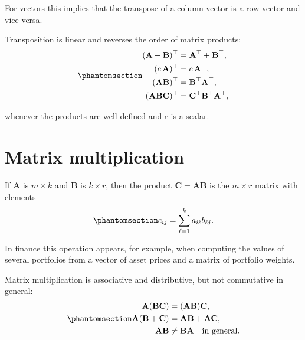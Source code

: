 \documentclass[
  letterpaper,
  DIV=11,
  numbers=noendperiod]{scrreprt}
\begin{document}
For vectors this implies that the transpose of a column vector is a row
vector and vice versa.

Transposition is linear and reverses the order of matrix products:
\begin{equation}\protect\phantomsection\label{eq-gen-0048}{  
\begin{align}
(\mathbf{A} + \mathbf{B})^{\top} &= \mathbf{A}^{\top} + \mathbf{B}^{\top}, \\
(c\,\mathbf{A})^{\top}           &= c\,\mathbf{A}^{\top}, \\
(\mathbf{A}\mathbf{B})^{\top}    &= \mathbf{B}^{\top}\mathbf{A}^{\top}, \\
(\mathbf{A}\mathbf{B}\mathbf{C})^{\top}
                                   &= \mathbf{C}^{\top}\mathbf{B}^{\top}\mathbf{A}^{\top},
\end{align}
}\end{equation}

whenever the products are well defined and \(c\) is a scalar.

\section{Matrix multiplication}\label{matrix-multiplication}

If \(\mathbf{A}\) is \(m \times k\) and \(\mathbf{B}\) is
\(k \times r\), then the product \(\mathbf{C}=\mathbf{A}\mathbf{B}\) is
the \(m \times r\) matrix with elements
\begin{equation}\protect\phantomsection\label{eq-gen-0049}{  
\begin{align}
c_{ij} = \sum_{\ell=1}^{k} a_{i\ell} b_{\ell j}.
\end{align}
}\end{equation}

In finance this operation appears, for example, when computing the
values of several portfolios from a vector of asset prices and a matrix
of portfolio weights.

Matrix multiplication is associative and distributive, but not
commutative in general:
\begin{equation}\protect\phantomsection\label{eq-gen-0050}{  
\begin{align}
\mathbf{A}(\mathbf{B}\mathbf{C}) &= (\mathbf{A}\mathbf{B})\mathbf{C}, \\
\mathbf{A}(\mathbf{B}+\mathbf{C}) &= \mathbf{A}\mathbf{B} + \mathbf{A}\mathbf{C}, \\
\mathbf{A}\mathbf{B} &\neq \mathbf{B}\mathbf{A} \quad \text{in general}.
\end{align}
}\end{equation}
\end{document}
